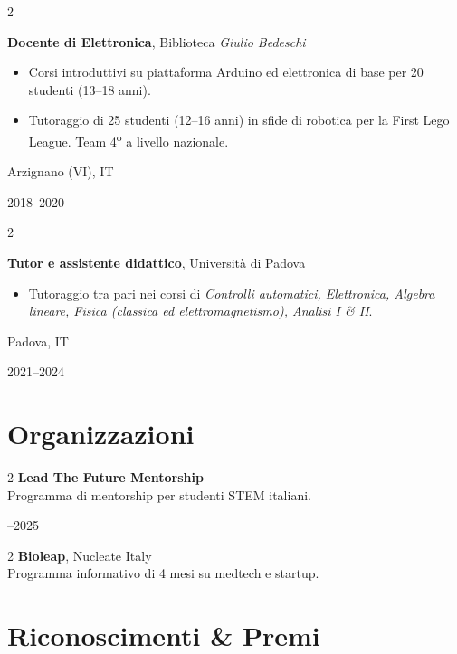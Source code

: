 \documentclass[10pt, letterpaper]{article}
\newenvironment{highlights}{
    \begin{itemize}[
        topsep=0.10 cm,
        parsep=0.10 cm,
        partopsep=0pt,
        itemsep=0pt,
        leftmargin=0.4 cm + 10pt
    ]
}{
    \end{itemize}
}
\newenvironment{twocolentry}[2][]{
    \onecolentry
    \def\secondColumn{#2}
    \setcolumnwidth{\fill, 4.5 cm}
    \begin{paracol}{2}
}{
    \switchcolumn \raggedleft \secondColumn
    \end{paracol}
    \endonecolentry
}
\begin{document}
    \begin{twocolentry}{
        Arzignano (VI), IT

2018--2020
    }
        \textbf{Docente di Elettronica}, Biblioteca \textit{Giulio Bedeschi}
        \begin{highlights}
            \item Corsi introduttivi su piattaforma Arduino ed elettronica di base per 20 studenti (13--18 anni).
            \item Tutoraggio di 25 studenti (12--16 anni) in sfide di robotica per la First Lego League. Team 4\textsuperscript{o} a livello nazionale.
        \end{highlights}
    \end{twocolentry}

    \vspace{0.2 cm}
    \begin{twocolentry}{
        Padova, IT

2021--2024
    }
        \textbf{Tutor e assistente didattico}, Università di Padova
        \begin{highlights}
            \item Tutoraggio tra pari nei corsi di \textit{Controlli automatici, Elettronica, Algebra lineare, Fisica (classica ed elettromagnetismo), Analisi I \& II}.
        \end{highlights}
    \end{twocolentry}

    \section{Organizzazioni}

    \begin{twocolentry}
        {2024--2025}{\textbf{Lead The Future Mentorship}\\
        Programma di mentorship per studenti STEM italiani.}
    \end{twocolentry}

    \vspace{0.1 cm}

    \begin{twocolentry}
        {2023}{\textbf{Bioleap}, Nucleate Italy\\
        Programma informativo di 4 mesi su medtech e startup.}
    \end{twocolentry}

    \section{Riconoscimenti \& Premi}
\end{document}
